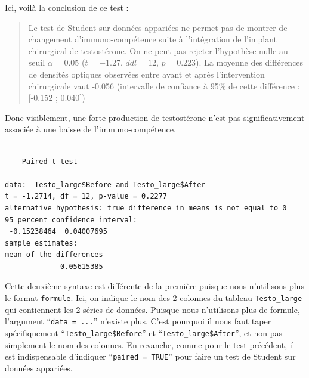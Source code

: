 \documentclass[
  a4paper,
]{article}
\newenvironment{Shaded}{\begin{snugshade}}{\end{snugshade}}
\newcommand{\CommentTok}[1]{\textcolor[rgb]{0.54,0.53,0.53}{#1}}
\newcommand{\DataTypeTok}[1]{\textcolor[rgb]{0.00,0.34,0.68}{#1}}
\newcommand{\KeywordTok}[1]{\textcolor[rgb]{0.12,0.11,0.11}{\textbf{#1}}}
\newcommand{\NormalTok}[1]{\textcolor[rgb]{0.12,0.11,0.11}{#1}}
\newcommand{\OperatorTok}[1]{\textcolor[rgb]{0.12,0.11,0.11}{#1}}
\newcommand{\OtherTok}[1]{\textcolor[rgb]{0.00,0.43,0.16}{#1}}
\begin{document}
Ici, voilà la conclusion de ce test :

\begin{quote}
Le test de Student sur données appariées ne permet pas de montrer de changement d'immuno-compétence suite à l'intégration de l'implant chirurgical de testostérone. On ne peut pas rejeter l'hypothèse nulle au seuil \(\alpha = 0.05\) (\(t = -1.27\), \(ddl = 12\), \(p = 0.223\)). La moyenne des différences de densités optiques observées entre avant et après l'intervention chirurgicale vaut -0.056 (intervalle de confiance à 95\% de cette différence : {[}-0.152 ; 0.040{]})
\end{quote}

Donc visiblement, une forte production de testostérone n'est pas significativement associée à une baisse de l'immuno-compétence.

\begin{Shaded}
\end{Shaded}

\begin{verbatim}

    Paired t-test

data:  Testo_large$Before and Testo_large$After
t = -1.2714, df = 12, p-value = 0.2277
alternative hypothesis: true difference in means is not equal to 0
95 percent confidence interval:
 -0.15238464  0.04007695
sample estimates:
mean of the differences 
            -0.05615385 
\end{verbatim}

Cette deuxième syntaxe est différente de la première puisque nous n'utilisons plus le format \texttt{formule}. Ici, on indique le nom des 2 colonnes du tableau \texttt{Testo\_large} qui contiennent les 2 séries de données. Puisque nous n'utilisons plus de formule, l'argument ``\texttt{data\ =\ ...}'' n'existe plus. C'est pourquoi il nous faut taper spécifiquement ``\texttt{Testo\_large\$Before}'' et ``\texttt{Testo\_large\$After}'', et non pas simplement le nom des colonnes. En revanche, comme pour le test précédent, il est indispensable d'indiquer ``\texttt{paired\ =\ TRUE}'' pour faire un test de Student sur données appariées.
\end{document}
